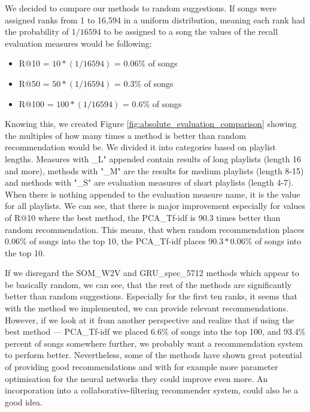 We decided to compare our methods to random suggestions. If songs were assigned ranks from 1 to 16,594 in a uniform distribution, meaning each rank had the probability of $1/16594$ to be assigned to a song the values of the recall evaluation measures would be following:
\begin{itemize}
    \item R@10 =  $ 10*(1/16594) $ = 0.06\% of songs
    \item R@50 = $ 50*(1/16594) $ = 0.3\% of songs
    \item R@100 = $ 100*(1/16594) $ = 0.6\% of songs
\end{itemize}

Knowing this, we created Figure \ref{fig:absolute_evaluation_comparison} showing the multiples of how many times a method is better than random recommendation would be. We divided it into categories based on playlist lengths. Measures with \_L" appended contain results of long playlists (length 16 and more), methods with "\_M" are the results for medium playlists (length 8-15) and methods with "\_S" are evaluation measures of short playlists (length 4-7). When there is nothing appended to the evaluation measure name, it is the value for all playlists. We can see, that there is major improvement especially for values of R@10 where the best method, the PCA\_Tf-idf is 90.3 times better than random recommendation. This means, that when random recommendation places 0.06\% of songs into the top 10, the PCA\_Tf-idf places $90.3*0.06\%$ of songs into the top 10. 

If we disregard the SOM\_W2V and GRU\_spec\_5712 methods which appear to be basically random, we can see, that the rest of the methods are significantly better than random suggestions. Especially for the first ten ranks, it seems that with the method we implemented, we can provide relevant recommendations. \\

However, if we look at it from another perspective and realize that if using the best method --- PCA\_Tf-idf we placed 6.6\% of songs into the top 100, and 93.4\% percent of songs somewhere further, we probably want a recommendation system to perform better. Nevertheless, some of the methods have shown great potential of providing good recommendations and with for example more parameter optimisation for the neural networks they could improve even more. An incorporation into a collaborative-filtering recommender system, could also be a good idea.

